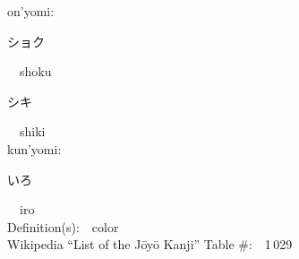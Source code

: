 \begin{multicols}{2}
{\hspace*{1em}}on'yomi:\ \ \\
{\hspace*{2em}}{\begin{CJK}{UTF8}{min} ショク \end{CJK}}\ \ shoku\ \ \\
{\hspace*{2em}}{\begin{CJK}{UTF8}{min} シキ \end{CJK}}\ \ shiki\ \ \\
{\hspace*{1em}}kun'yomi:\ \ \\
{\hspace*{2em}}{\begin{CJK}{UTF8}{min} いろ \end{CJK}}\ \ iro\ \ \\
Definition(s):\ \ color \\
Wikipedia ``List of the J\=oy\=o Kanji'' Table \#:\ \ 1\,029 \\
\ \ \\
\end{multicols}



